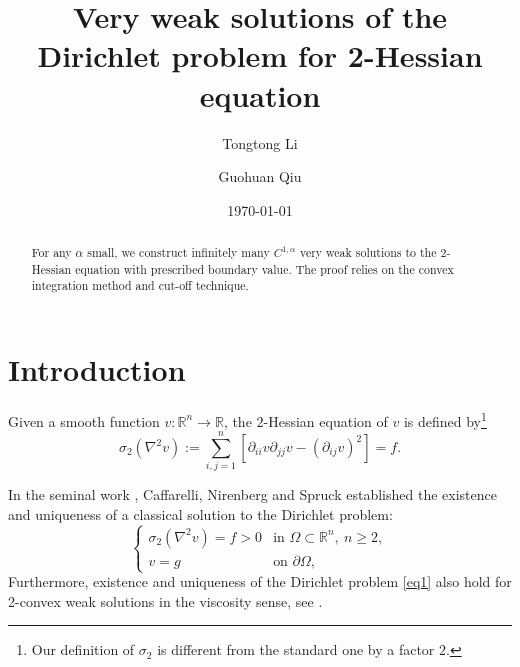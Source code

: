 \documentclass[reqno,12pt]{amsart}
\title{Very weak solutions of the Dirichlet problem for 2-Hessian equation}
\author{Tongtong Li}
\author{Guohuan Qiu}
\date{\today}
\numberwithin{equation}{section}
\theoremstyle{plain}
\theoremstyle{definition}
\newcommand{\R}{\mathbb{R}}
\begin{document}
\maketitle
\begin{abstract}
   For any $\alpha $ small, we construct infinitely many $C^{1,\alpha}$ very weak solutions to the 2-Hessian equation with prescribed boundary value. The proof relies on the convex integration method and cut-off technique.
\end{abstract}


\setlength{\parskip}{0.5em}

\section{Introduction}


Given a smooth function $v:\R^n\to\R$, the $2$-Hessian equation of $v$ is defined by\footnote{Our definition of $\sigma_2$ is different from the standard one by a factor $2$.}
\begin{equation}
\sigma_2(\nabla^2v) :=\sum^n_{i,j=1}[\partial_{ii}v\partial_{jj}v-(\partial_{ij}v)^2] =f. \label{sigma2}
\end{equation}

In the seminal work \cite{caffarelli1985dirichlet}, Caffarelli, Nirenberg and Spruck established the existence and uniqueness of a classical solution to the Dirichlet problem:
\begin{equation}
\begin{cases}\label{eq1}
\sigma_2(\nabla^2 v) = f>0 &\text{in }\Omega\subset\R^n,\ n\ge2, \\
    v = g &\text{on }\partial\Omega,
\end{cases}
\end{equation}
Furthermore, existence and uniqueness of the Dirichlet problem \eqref{eq1} also hold for 2-convex weak solutions in the viscosity sense, see \cite{urbas1990existence,trudinger1990dirichlet}.
\end{document}
